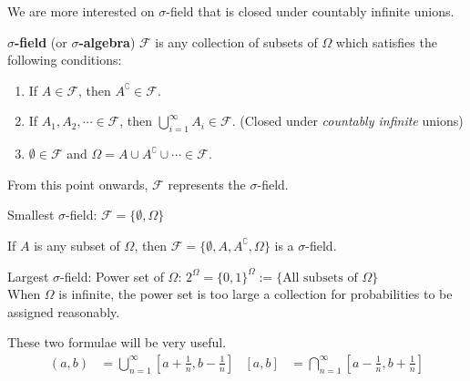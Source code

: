 \documentclass{huhtakm-template-book}
\begin{document}
    \newpage
    We are more interested on $\sigma$-field that is closed under countably infinite unions.
    \begin{defn} %
        \textbf{$\sigma$-field} (or \textbf{$\sigma$-algebra}) $\mathcal{F}$ is any collection of subsets of $\Omega$ which satisfies the following conditions:
        \begin{enumerate}
            \item If $A\in\mathcal{F}$, then $A^{\complement}\in\mathcal{F}$.
            \item If $A_{1},A_{2},\cdots\in\mathcal{F}$, then $\bigcup_{i=1}^{\infty}A_{i}\in\mathcal{F}$. (Closed under \textit{countably infinite} unions)
            \item $\emptyset\in\mathcal{F}$ and $\Omega=A\cup A^{\complement}\cup\cdots\in\mathcal{F}$.
        \end{enumerate}
    \end{defn}
    \begin{rem}
    	From this point onwards, $\mathcal{F}$ represents the $\sigma$-field.
    \end{rem}
    \begin{eg}
        Smallest $\sigma$-field: $\mathcal{F}=\{\emptyset,\Omega\}$
    \end{eg}
    \begin{eg}
        If $A$ is any subset of $\Omega$, then $\mathcal{F}=\{\emptyset,A,A^{\complement},\Omega\}$ is a $\sigma$-field.
    \end{eg}
    \begin{eg}
        Largest $\sigma$-field: Power set of $\Omega$: $2^{\Omega}=\{0,1\}^{\Omega}:=\{\text{All subsets of }\Omega\}$\\
        When $\Omega$ is infinite, the power set is too large a collection for probabilities to be assigned reasonably.
    \end{eg}
    \begin{rem}
        These two formulae will be very useful.
        \begin{align*}
		    (a,b)&=\bigcup_{n=1}^{\infty}\left[a+\frac{1}{n},b-\frac{1}{n}\right] &            [a,b]&=\bigcap_{n=1}^{\infty}\left[a-\frac{1}{n},b+\frac{1}{n}\right]
        \end{align*}
    \end{rem}
    
\end{document}

